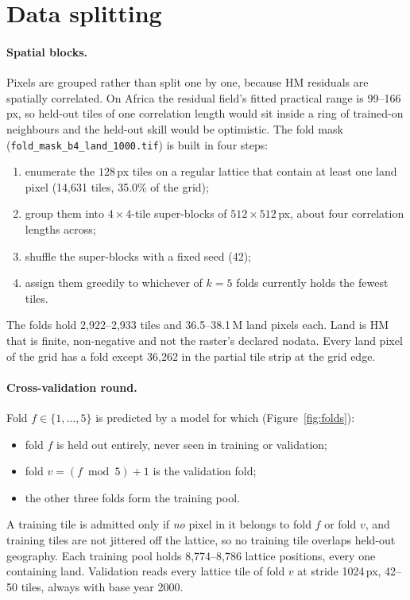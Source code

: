 \documentclass[11pt,a4paper]{article}
\newcommand{\code}[1]{\texttt{\small #1}}
\begin{document}
\section{Data splitting}
\label{sec:split}

\paragraph{Spatial blocks.} Pixels are grouped rather than split one by one, because HM residuals
are spatially correlated. On Africa the residual field's fitted practical range is 99--166\,px,
so held-out tiles of one correlation length would sit inside a ring of trained-on neighbours and
the held-out skill would be optimistic. The fold mask (\code{fold\_mask\_b4\_land\_1000.tif}) is
built in four steps:
\begin{enumerate}
\item enumerate the $128$\,px tiles on a regular lattice that contain at least one land pixel
  (14,631 tiles, 35.0\% of the grid);
\item group them into $4\times4$-tile super-blocks of $512\times512$\,px, about four correlation
  lengths across;
\item shuffle the super-blocks with a fixed seed (42);
\item assign them greedily to whichever of $k=5$ folds currently holds the fewest tiles.
\end{enumerate}
The folds hold 2,922--2,933 tiles and 36.5--38.1\,M land pixels each. Land is HM that is
finite, non-negative and not the raster's declared nodata. Every land pixel of the grid has a fold
except 36,262 in the partial tile strip at the grid edge.

\paragraph{Cross-validation round.} Fold $f\in\{1,\dots,5\}$ is predicted by a model for which
(Figure~\ref{fig:folds}):
\begin{itemize}
\item fold $f$ is held out entirely, never seen in training or validation;
\item fold $v=(f\bmod 5)+1$ is the validation fold;
\item the other three folds form the training pool.
\end{itemize}
A training tile is admitted only if \emph{no} pixel in it belongs to fold $f$ or fold $v$, and
training tiles are not jittered off the lattice, so no training tile overlaps held-out
geography. Each training pool holds 8,774--8,786 lattice positions, every one containing land.
Validation reads every lattice tile of fold $v$ at stride 1024\,px, 42--50 tiles, always with base
year 2000.
\end{document}
